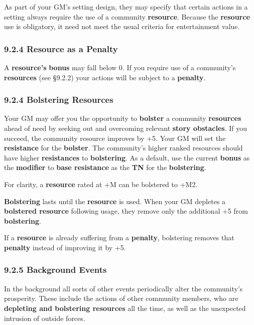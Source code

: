 \documentclass[
  11pt,
]{article}
\begin{document}
As part of your GM's setting design, they may specify that certain
actions in a setting always require the use of a community
\textbf{resource}. Because the \textbf{resource} use is obligatory, it
need not meet the usual criteria for entertainment value.

\hypertarget{resource-as-a-penalty}{%
\subsubsection{9.2.4 Resource as a
Penalty}\label{resource-as-a-penalty}}

A \textbf{resource's} \textbf{bonus} may fall below 0. If you require
use of a community's \textbf{resources} (see §9.2.2) your actions will
be subject to a \textbf{penalty}.

\hypertarget{bolstering-resources}{%
\subsubsection{9.2.4 Bolstering Resources}\label{bolstering-resources}}

Your GM may offer you the opportunity to \textbf{bolster} a community
\textbf{resources} ahead of need by seeking out and overcoming relevant
\textbf{story obstacles}. If you succeed, the community resource
improves by +5. Your GM will set the \textbf{resistance} for the
\textbf{bolster}. The community's higher ranked resources should have
higher \textbf{resistances} to \textbf{bolstering}. As a default, use
the current \textbf{bonus} as the \textbf{modifier} to \textbf{base
resistance} as the \textbf{TN} for the \textbf{bolstering}.

For clarity, a \textbf{resource} rated at +M can be bolstered to +M2.

\textbf{Bolstering} lasts until the \textbf{resource} is used. When your
GM depletes a \textbf{bolstered resource} following usage, they remove
only the additional +5 from \textbf{bolstering}.

If a \textbf{resource} is already suffering from a \textbf{penalty},
bolstering removes that \textbf{penalty} instead of improving it by +5.

\hypertarget{background-events}{%
\subsubsection{9.2.5 Background Events}\label{background-events}}

In the background all sorts of other events periodically alter the
community's prosperity. These include the actions of other community
members, who are \textbf{depleting and bolstering resources} all the
time, as well as the unexpected intrusion of outside forces.
\end{document}

